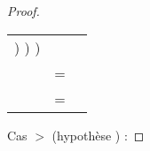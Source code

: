\begin{proof}
\begin{tabular}{p{.5cm} p{.5cm} p{11.5cm}}
{{{{          })
        })
      })
    } \\
    & = &
    \comp{\underline{\mbox{\lstinline'e_2'}} $\Zclear \semicolon$}{
      (\comp{\underline{\mbox{\lstinline'e_1'}} $\Zclear \semicolon$}{
        (\comp{\underline{\mbox{\lstinline'k'}} $\Zclear \semicolon$}{(
          \comp{
            $\mbox{\lstinline'while('}
            \underline{\mbox{\lstinline'k <= e_2'}}~ \mbox{\lstinline'&& e')}
            \bopen
            I_3
            \cdot \mbox{\lstinline'e = e_3;'}
            \cdot \underline{\mbox{\lstinline'k++'}} \semicolon \bclose$
          }{
            (\comp{$\Zinit \underline{\mbox{\lstinline'k = e_1;'}}$}{
              (\env[$e_1 \mapsto$ \eval{$t_1$}{\env},
                $e_2 \mapsto$ \eval{$t_2$}{\env},
                $e \mapsto$ 1])
            })
          })
        })
      })
    } \\
    & = &
    \comp{\underline{\mbox{\lstinline'e_2'}} $\Zclear \semicolon$}{
      (\comp{\underline{\mbox{\lstinline'e_1'}} $\Zclear \semicolon$}{
        (\comp{\underline{\mbox{\lstinline'k'}} $\Zclear \semicolon$}{(
          \comp{
            $\mbox{\lstinline'while('}
            \underline{\mbox{\lstinline'k <= e_2'}}~ \mbox{\lstinline'&& e')}
            \bopen
            I_3
            \cdot \mbox{\lstinline'e = e_3;'}
            \cdot \underline{\mbox{\lstinline'k++'}} \semicolon \bclose$
          }{
            (\env[$e_1 \mapsto$ \eval{$t_1$}{\env},
              $e_2 \mapsto$ \eval{$t_2$}{\env},
              $e \mapsto$ 1,
              $k \mapsto$ \eval{$t_1$}{\env}])
          })
        })
      })
    } \\
  \end{tabular}

  Cas  $>$  (hypothèse ) :


\end{proof}
